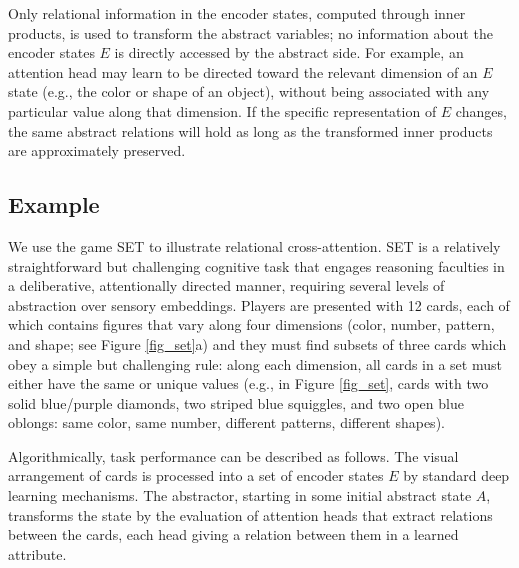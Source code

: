 Only relational information in the encoder states, computed through inner products, 
is used to transform the abstract variables; no information about the encoder states $E$ is directly accessed by the abstract side. For example, an attention head may learn to be directed toward the relevant dimension of an $E$ state (e.g., the color or shape of an object), without being associated with any particular value along that dimension. If the specific representation of $E$ changes, the same abstract relations will hold as long as the transformed inner products are approximately preserved. 



\subsection{Example}

We use the game SET to illustrate relational cross-attention. SET is a relatively straightforward but challenging cognitive task that engages reasoning faculties in a deliberative, attentionally directed manner, requiring several levels of abstraction over sensory embeddings. Players are presented with 12 cards, each of which contains figures that vary along four dimensions (color, number, pattern, and shape; see Figure \ref{fig_set}a) and they must find subsets of three cards which obey a simple but challenging rule: along each dimension, all cards in a set must either have the same or unique values (e.g., in Figure \ref{fig_set}, cards with two solid blue/purple diamonds, two striped blue squiggles, and two open blue oblongs: same color, same number, different patterns, different shapes). 

Algorithmically, task performance can be described as follows. The visual arrangement of cards is processed into a set of encoder states $E$ by standard deep learning mechanisms. The abstractor, starting in some initial abstract state $A$, transforms the state by the evaluation of attention heads that extract relations between the cards, each head giving a relation between them in a learned attribute. 

\def\redcard{\colorbox{red!30}{R}\hskip.2em}
\def\bluecard{\colorbox{blue!30}{B}\hskip.2em}
\def\greencard{\colorbox{green!50}{G}\hskip.2em}
\def\onecard{\fbox{\hskip1pt 1\hskip1pt}\hskip.2em}
\def\twocard{\fbox{\hskip1pt 2\hskip1pt}\hskip.2em}
\def\threecard{\fbox{\hskip1pt 3\hskip1pt}\hskip.2em}

